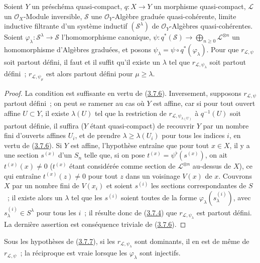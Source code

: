 \begin{proposition}[3.7.7]
\label{II.3.7.7-fr}
Soient $Y$ un préschéma quasi-compact, $q:X\to Y$ un morphisme quasi-compact,
$\mathcal{L}$ un $\mathcal{O}_X$-Module inversible, $\mathcal{S}$ une
$\mathcal{O}_Y$-Algèbre graduée quasi-cohérente, limite inductive filtrante
d'un système inductif $(\mathcal{S}^\lambda)$ de $\mathcal{O}_Y$-Algèbres
quasi-cohérentes. Soient
$\varphi_\lambda:\mathcal{S}^\lambda\to\mathcal{S}$ l'homomorphisme
canonique,
$\psi:q^*(\mathcal{S})\to\bigoplus_{n\geq0}\mathcal{L}^{\otimes n}$ un
homomorphisme d'Algèbres graduées, et posons
$\psi_\lambda=\psi\circ q^*(\varphi_\lambda)$. Pour que
$r_{\mathcal{L},\psi}$ soit partout défini, il faut et il suffit qu'il existe
un $\lambda$ tel que $r_{\mathcal{L},\psi_\lambda}$ soit partout défini~;
$r_{\mathcal{L},\psi_\mu}$ est alors partout défini pour $\mu\geq\lambda$.
\end{proposition}

\begin{proof}
La condition est suffisante en vertu de
(\hyperref[II.3.7.6-fr]{3.7.6}). Inversement, supposons
$r_{\mathcal{L},\psi}$ partout défini~; on peut se ramener au cas où $Y$ est
affine, car si pour tout ouvert affine $U\subset Y$, il existe $\lambda(U)$
tel que la restriction de $r_{\mathcal{L},\psi_{\lambda(U)}}$ à $q^{-1}(U)$
soit partout définie, il suffira ($Y$ étant quasi-compact) de recouvrir $Y$
par un nombre fini d'ouverts affines $U_i$, et de prendre
$\lambda\geq\lambda(U_i)$ pour tous les indices $i$, en vertu de
(\hyperref[II.3.7.6-fr]{3.7.6}). Si $Y$ est affine, l'hypothèse entraîne que
pour tout $x\in X$, il y a une section $s^{(x)}$ d'un $S_n$ telle que, si on
pose $t^{(x)}=\psi^\flat(s^{(x)})$, on ait $t^{(x)}(x)\neq0$
($t^{(x)}$ étant considérée comme section de $\mathcal{L}^{\otimes n}$
au-dessus de $X$), ce qui entraîne $t^{(x)}(z)\neq0$ pour tout $z$ dans un
voisinage $V(x)$ de $x$. Couvrons $X$ par un nombre fini de $V(x_i)$ et
soient $s^{(i)}$ les sections correspondantes de $S$~; il existe alors un
$\lambda$ tel que les $s^{(i)}$ soient toutes de la forme
$\varphi_\lambda(s_\lambda^{(i)})$, avec $s_\lambda^{(i)}\in S^\lambda$ pour
tous les $i$~; il résulte donc de (\hyperref[II.3.7.4-fr]{3.7.4}) que
$r_{\mathcal{L},\psi_\lambda}$ est partout défini. La dernière assertion est
conséquence triviale de (\hyperref[II.3.7.6-fr]{3.7.6}).
\end{proof}

\begin{corollary}[3.7.8]
\label{II.3.7.8-fr}
Sous les hypothèses de (\hyperref[II.3.7.7-fr]{3.7.7}), si les
$r_{\mathcal{L},\psi_\lambda}$ sont dominants, il en est de même de
$r_{\mathcal{L},\psi}$~; la réciproque est vraie lorsque les
$\varphi_\lambda$ sont injectifs.
\end{corollary}

